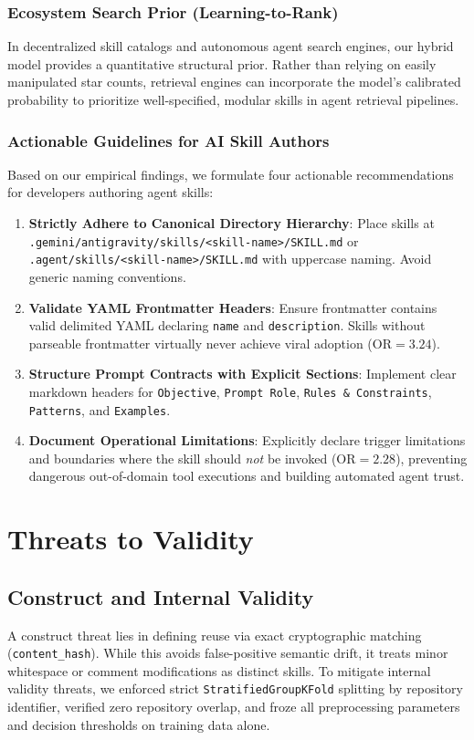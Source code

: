 \documentclass[12pt]{article}
\begin{document}
\subsubsection{Ecosystem Search Prior (Learning-to-Rank)}
In decentralized skill catalogs and autonomous agent search engines, our hybrid model provides a quantitative structural prior. Rather than relying on easily manipulated star counts, retrieval engines can incorporate the model's calibrated probability to prioritize well-specified, modular skills in agent retrieval pipelines.

\subsubsection{Actionable Guidelines for AI Skill Authors}
Based on our empirical findings, we formulate four actionable recommendations for developers authoring agent skills:
\begin{enumerate}
    \item \textbf{Strictly Adhere to Canonical Directory Hierarchy}: Place skills at \texttt{.gemini/antigravity/skills/<skill-name>/SKILL.md} or \texttt{.agent/skills/<skill-name>/SKILL.md} with uppercase naming. Avoid generic naming conventions.
    \item \textbf{Validate YAML Frontmatter Headers}: Ensure frontmatter contains valid delimited YAML declaring \texttt{name} and \texttt{description}. Skills without parseable frontmatter virtually never achieve viral adoption ($\text{OR} = 3.24$).
    \item \textbf{Structure Prompt Contracts with Explicit Sections}: Implement clear markdown headers for \texttt{Objective}, \texttt{Prompt Role}, \texttt{Rules \& Constraints}, \texttt{Patterns}, and \texttt{Examples}.
    \item \textbf{Document Operational Limitations}: Explicitly declare trigger limitations and boundaries where the skill should \emph{not} be invoked ($\text{OR} = 2.28$), preventing dangerous out-of-domain tool executions and building automated agent trust.
\end{enumerate}

\section{Threats to Validity}

\subsection{Construct and Internal Validity}
A construct threat lies in defining reuse via exact cryptographic matching (\texttt{content\_hash}). While this avoids false-positive semantic drift, it treats minor whitespace or comment modifications as distinct skills. To mitigate internal validity threats, we enforced strict \texttt{StratifiedGroupKFold} splitting by repository identifier, verified zero repository overlap, and froze all preprocessing parameters and decision thresholds on training data alone.
\end{document}
